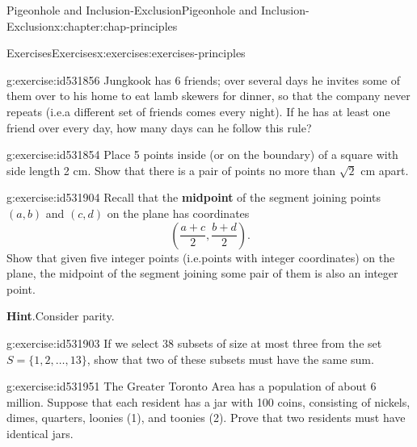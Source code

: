 \documentclass[oneside,10pt,]{book}
\newcommand{\blocktitlefont}{\relax}
\newcommand{\terminology}[1]{\textbf{#1}}
\numberwithin{equation}{section}
\begin{document}
\begin{chapterptx}{Pigeonhole and Inclusion-Exclusion}{}{Pigeonhole and Inclusion-Exclusion}{}{}{x:chapter:chap-principles}
\begin{exercises-section}{Exercises}{}{Exercises}{}{}{x:exercises:exercises-principles}
\begin{divisionexercise}{5}{}{}{g:exercise:id531856}
Jungkook has 6 friends; over several days he invites some of them over to his home to eat lamb skewers for dinner, so that the company never repeats (i.e.\@ a different set of friends comes every night). If he has at least one friend over every day, how many days can he follow this rule?%
\par
%
\end{divisionexercise}%
\begin{divisionexercise}{6}{}{}{g:exercise:id531854}%
Place 5 points inside (or on the boundary) of a square with side length 2 cm. Show that there is a pair of points no more than \(\sqrt{2}\) cm apart.%
\begin{sidebyside}{1}{0.425}{0.425}{0}%
\begin{sbspanel}{0.15}%
%
\end{sbspanel}%
\end{sidebyside}%
\end{divisionexercise}%
\begin{divisionexercise}{7}{}{}{g:exercise:id531904}%
Recall that the \terminology{midpoint} of the segment joining points \((a,b)\) and \((c,d)\) on the plane has coordinates%
\begin{equation*}
\left(\frac{a+c}{2},\frac{b+d}{2}\right)\text{.}
\end{equation*}
Show that given five integer points (i.e.\@ points with integer coordinates) on the plane, the midpoint of the segment joining some pair of them is also an integer point.%
\par\smallskip%
\noindent\textbf{\blocktitlefont Hint}.\hypertarget{g:hint:id531914}{}\quad{}Consider parity.%
\end{divisionexercise}%
\begin{divisionexercise}{8}{}{}{g:exercise:id531903}%
If we select 38 subsets of size at most three from the set \(S = \{1,2,\ldots,13\}\), show that two of these subsets must have the same sum.%
\end{divisionexercise}%
\begin{divisionexercise}{9}{}{}{g:exercise:id531951}%
The Greater Toronto Area has a population of about 6 million. Suppose that each resident has a jar with 100 coins, consisting of nickels, dimes, quarters, loonies (\textdollar{}1), and toonies (\textdollar{}2). Prove that two residents must have identical jars.%

\end{divisionexercise}
\end{exercises-section}
\end{chapterptx}
\end{document}
